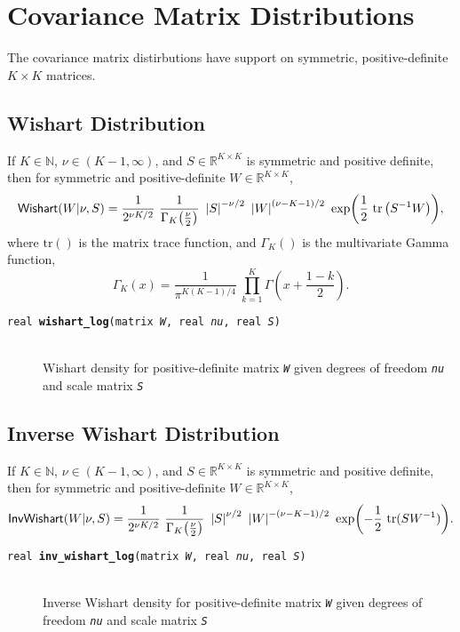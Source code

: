 \documentclass[10pt]{report}
\newcommand{\distro}[1]{\mbox{\sf #1}}
\newcommand{\reals}{\mathbb{R}}
\newcommand{\nats}{\mathbb{N}}
\newcommand{\fitem}[4]{\item[{\tt #1 {\bfseries #2}(#3)}]\mbox{ } \\[4pt] #4}
\newcommand{\farg}[1]{{\tt\slshape #1}}
\begin{document}
\section{Covariance Matrix Distributions}

The covariance matrix distirbutions have support on symmetric,
positive-definite $K \times K$ matrices.

\subsection{Wishart Distribution}

If $K \in \nats$, $\nu \in (K-1,\infty)$, and $S \in \reals^{K \times K}$ is symmetric
and positive definite, then for symmetric and positive-definite $W \in
\reals^{K \times K}$,
\[
\distro{Wishart}(W|\nu,S)
=
\frac{1}{2^{\nu K / 2}}
\
\frac{1}{\Gamma_K \! \left( \frac{\nu}{2} \right)}
\
\left| S \right|^{-\nu/2}
\
\left| W \right|^{(\nu - K - 1)/2}
\
\exp \! \left(\frac{1}{2} \ \mbox{tr}\left( S^{-1} W \right) \right)
\! ,
\]
%
where $\mbox{tr}()$ is the matrix trace function, and $\Gamma_K()$ is
the multivariate Gamma function,
\[
\Gamma_K(x) = 
\frac{1}{\pi^{K(K-1)/4}}
\
\prod_{k=1}^K \Gamma \left( x + \frac{1 - k}{2} \right)
\!.
\]

\begin{description}
%
\fitem{real}{wishart\_log}{matrix \farg{W}, real \farg{nu}, real
 \farg{S}}{Wishart density for positive-definite matrix
 \farg{W} given degrees of freedom \farg{nu} and scale matrix
 \farg{S}}
%
\end{description}


\subsection{Inverse Wishart Distribution}

If $K \in \nats$, $\nu \in (K-1,\infty)$, and $S \in \reals^{K \times
  K}$ is symmetric and positive definite, then for symmetric and
positive-definite $W \in \reals^{K \times K}$,
\[
\distro{InvWishart}(W|\nu,S)
= 
\frac{1}{2^{\nu K / 2}}
\
\frac{1}{\Gamma_K \! \left( \frac{\nu}{2} \right)}
\
\left| S \right|^{\nu/2}
\
\left| W \right|^{-(\nu - K - 1)/2}
\
\exp \! \left( 
- \frac{1}{2}
\
\mbox{tr}(SW^{-1})
\right)
\! .
\]

\begin{description}
%
\fitem{real}{inv\_wishart\_log}{matrix \farg{W}, real \farg{nu}, real
 \farg{S}}{Inverse Wishart density for positive-definite matrix
 \farg{W} given degrees of freedom \farg{nu} and scale matrix
 \farg{S}}
%
\end{description}
\end{document}
